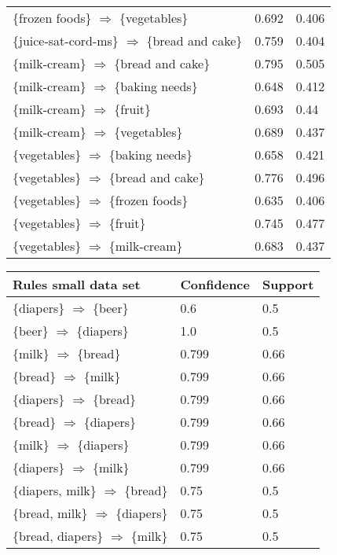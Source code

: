 \begin{table}[H]
\begin{tabular}{| l | l | l |}
			\{frozen foods\} $\Rightarrow$ \{vegetables\}  & 0.692  & 0.406 \\
			\{juice-sat-cord-ms\} $\Rightarrow$ \{bread and cake\}  & 0.759 & 0.404 \\
			\{milk-cream\} $\Rightarrow$ \{bread and cake\}  & 0.795  & 0.505 \\ 
			\{milk-cream\} $\Rightarrow$ \{baking needs\}  & 0.648  & 0.412 \\
			\{milk-cream\} $\Rightarrow$ \{fruit\}  & 0.693  & 0.44 \\
			\{milk-cream\} $\Rightarrow$ \{vegetables\}  & 0.689  & 0.437 \\
			\{vegetables\} $\Rightarrow$ \{baking needs\}  & 0.658  & 0.421 \\
			\{vegetables\} $\Rightarrow$ \{bread and cake\}  & 0.776  & 0.496 \\
			\{vegetables\} $\Rightarrow$ \{frozen foods\}  & 0.635  & 0.406 \\
			\{vegetables\} $\Rightarrow$ \{fruit\}  & 0.745  & 0.477 \\
			\{vegetables\} $\Rightarrow$ \{milk-cream\}  & 0.683  & 0.437 \\
			\hline
		\end{tabular}
	\end{table}

	\begin{table}[H]
		\begin{tabular}{| l | l | l |}
			\hline
			Rules small data set & Confidence & Support \\ \hline
			\{diapers\} $\Rightarrow$ \{beer\} 	& 0.6 	& 0.5 \\ 
			\{beer\} $\Rightarrow$ \{diapers\} 	& 1.0  	& 0.5 \\
			\{milk\} $\Rightarrow$ \{bread\} 	& 0.799 & 0.66 \\
			\{bread\} $\Rightarrow$ \{milk\} 	& 0.799 & 0.66 \\
			\{diapers\} $\Rightarrow$ \{bread\}  & 0.799 & 0.66 \\
			\{bread\} $\Rightarrow$ \{diapers\} 	& 0.799 & 0.66 \\
			\{milk\} $\Rightarrow$ \{diapers\} 	& 0.799 & 0.66 \\
			\{diapers\} $\Rightarrow$ \{milk\} 	& 0.799 & 0.66 \\
			\{diapers, milk\} $\Rightarrow$ \{bread\} & 0.75 & 0.5 \\
			\{bread, milk\} $\Rightarrow$ \{diapers\} & 0.75 & 0.5 \\
			\{bread, diapers\} $\Rightarrow$ \{milk\} & 0.75 & 0.5 \\
			\hline
		\end{tabular}
	\end{table}